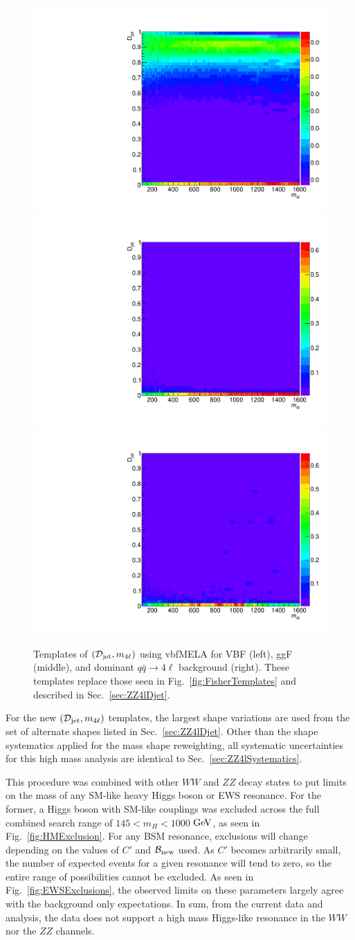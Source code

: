 \begin{figure}[htbp]
\begin{center}
\includegraphics[width=.3\linewidth]{HiggsProperties/figures/qqH_Djet_template.pdf}
\includegraphics[width=.3\linewidth]{HiggsProperties/figures/ggH_Djet_template.pdf}
\includegraphics[width=.3\linewidth]{HiggsProperties/figures/qqZZ_Djet_template.pdf}
\caption[Templates of $\mathcal{D}_{\rm{jet}}$ Using vbfMELA]{Templates of $(\mathcal{D}_{\rm{jet}},m_{4\ell})$ using vbfMELA for VBF (left), ggF (middle), and dominant $q\bar{q}\rightarrow 4\ell$ background (right). These templates replace those seen in Fig.~\ref{fig:FisherTemplates} and described in Sec.~\ref{sec:ZZ4lDjet}.}
\label{fig:vbfMELATemplates}
\end{center}
\end{figure}

For the new $(\mathcal{D}_{\rm{jet}},m_{4\ell})$ templates, the largest shape variations are used from the set of alternate shapes listed in Sec.~\ref{sec:ZZ4lDjet}. Other than the shape systematics applied for the mass shape reweighting, all systematic uncertainties for this high mass analysis are identical to Sec.~\ref{sec:ZZ4lSystematics}. 

This procedure was combined with other $WW$ and $ZZ$ decay states to put limits on the mass of any SM-like heavy Higgs boson or EWS resonance. For the former, a Higgs boson with SM-like couplings was excluded across the full combined search range of $145 < m_{H} < 1000$ $\rm{GeV}$, as seen in Fig.~\ref{fig:HMExclusion}. For any BSM resonance, exclusions will change depending on the values of $C'$ and $\mathcal{B}_{\rm{new}}$ used. As $C'$ becomes arbitrarily small, the number of expected events for a given resonance will tend to zero, so the entire range of possibilities cannot be excluded. As seen in Fig.~\ref{fig:EWSExclusions}, the observed limits on these parameters largely agree with the background only expectations. In sum, from the current data and analysis, the data does not support a high mass Higgs-like resonance in the $WW$ nor the $ZZ$ channels.

